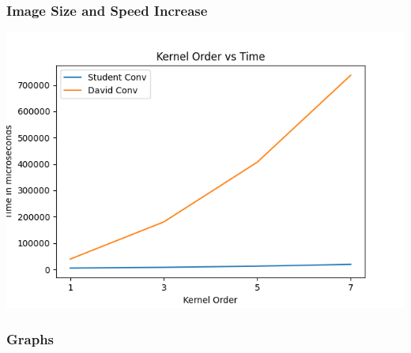 \documentclass{beamer}
\begin{document}
\begin{frame}[fragile]
\frametitle{Image Size and Speed Increase}
\includegraphics[width=1\textwidth]{images/kernel_vs_time_64-64-X-32-32}
\end{frame}

\begin{frame}[fragile]
\frametitle{Graphs}
\end{frame}
\end{document}
